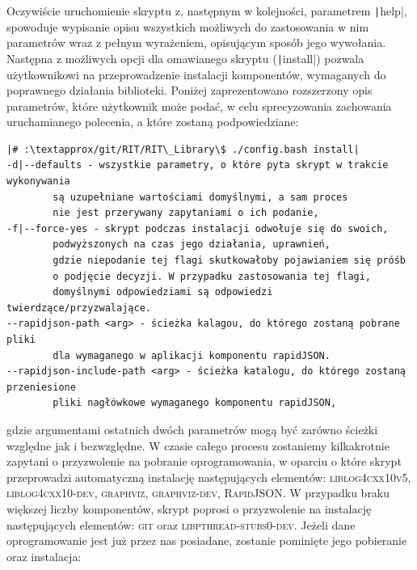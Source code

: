 Oczywiście uruchomienie skryptu z, następnym w kolejności, parametrem \texttt|help|, spowoduje wypisanie opisu wszystkich możliwych do zastosowania w nim parametrów wraz z pełnym wyrażeniem, opisującym sposób jego wywołania. Następna z możliwych opcji dla omawianego skryptu (\texttt|install|) pozwala użytkownikowi na przeprowadzenie instalacji komponentów, wymaganych do poprawnego działania biblioteki. Poniżej zaprezentowano rozszerzony opis parametrów, które użytkownik może podać, w celu sprecyzowania zachowania uruchamianego polecenia, a które zostaną podpowiedziane:
\begin{verbatim}
|# :\textapprox/git/RIT/RIT\_Library\$ ./config.bash install|
-d|--defaults - wszystkie parametry, o które pyta skrypt w trakcie wykonywania 
		są uzupełniane wartościami domyślnymi, a sam proces 
		nie jest przerywany zapytaniami o ich podanie,
-f|--force-yes - skrypt podczas instalacji odwołuje się do swoich, 
		podwyższonych na czas jego działania, uprawnień, 
		gdzie niepodanie tej flagi skutkowałoby pojawianiem się próśb 
		o podjęcie decyzji. W przypadku zastosowania tej flagi, 
		domyślnymi odpowiedziami są odpowiedzi twierdzące/przyzwalające.
--rapidjson-path <arg> - ścieżka kalagou, do którego zostaną pobrane pliki 
		dla wymaganego w aplikacji komponentu rapidJSON.
--rapidjson-include-path <arg> - ścieżka katalogu, do którego zostaną przeniesione 
		pliki nagłówkowe wymaganego komponentu rapidJSON,
\end{verbatim}
gdzie argumentami ostatnich dwóch parametrów mogą być zarówno ścieżki względne jak i bezwzględne. W czasie całego procesu zostaniemy kilkakrotnie zapytani o przyzwolenie na pobranie oprogramowania, w oparciu o które skrypt przeprowadzi automatyczną  instalację następujących elementów: \textsc{liblog4cxx10v5}, \textsc{liblog4cxx10-dev}, \textsc{graphviz}, \textsc{graphviz-dev}, \textsc{RapidJSON}. W przypadku braku większej liczby komponentów, skrypt poprosi o przyzwolenie na instalację następujących elementów: \textsc{git} oraz \textsc{libpthread-stubs0-dev}. Jeżeli dane oprogramowanie jest już przez nas posiadane, zostanie pominięte jego pobieranie oraz instalacja:

